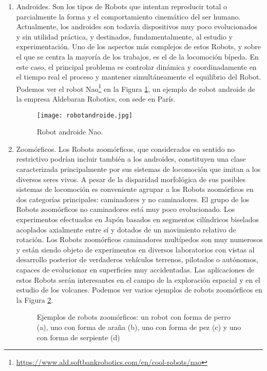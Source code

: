 \begin{enumerate}[1.]
	\item Androides. Son los tipos de Robots que intentan reproducir total o parcialmente la forma y el comportamiento cinemático del ser humano. Actualmente, los androides son todavía dispositivos muy poco evolucionados y sin utilidad práctica, y destinados, fundamentalmente, al estudio y experimentación. Uno de los aspectos más complejos de estos Robots, y sobre el que se centra la mayoría de los trabajos, es el de la locomoción bípeda. En este caso, el principal problema es controlar dinámica y coordinadamente en el tiempo real el proceso y mantener simultáneamente el equilibrio del Robot. Podemos ver el robot Nao\footnote{\url{https://www.ald.softbankrobotics.com/en/cool-robots/nao}} en la Figura \ref{fig:androide}, un ejemplo de robot androide de la empresa Aldebaran Robotics, con sede en París. 
	\begin{figure}[h]
		\centering\texttt{[image: robotandroide.jpg]}
		\caption{Robot androide Nao.}
		\label{fig:androide}
	\end{figure}

	\item Zoomórficos. Los Robots zoomórficos, que considerados en sentido no restrictivo podrían incluir también a los androides, constituyen una clase caracterizada principalmente por sus sistemas de locomoción que imitan a los diversos seres vivos. A pesar de la disparidad morfológica de sus posibles sistemas de locomoción es conveniente agrupar a los Robots zoomórficos en dos categorías principales: caminadores y no caminadores. El grupo de los Robots zoomórficos no caminadores está muy poco evolucionado. Los experimentos efectuados en Japón basados en segmentos cilíndricos biselados acoplados axialmente entre sí y dotados de un movimiento relativo de rotación. Los Robots zoomórficos caminadores multípedos son muy numerosos y están siendo objeto de experimentos en diversos laboratorios con vistas al desarrollo posterior de verdaderos vehículos terrenos, pilotados o autónomos, capaces de evolucionar en superficies muy accidentadas. Las aplicaciones de estos Robots serán interesantes en el campo de la exploración espacial y en el estudio de los volcanes. Podemos ver varios ejemplos de robots zoomórficos en la Figura \ref{fig:zoomorficos}.
	\begin{figure}[h]
		\centering
		\hspace{0.04\textwidth}	
		\vspace{0.03\textwidth}
		\hspace{0.04\textwidth}
		\caption[Diferentes ejemplos de robots zoomórficos]{Ejemplos de robots zoomórficos: un robot con forma de perro (a), uno con forma de araña (b), uno con forma de pez (c) y uno con forma de serpiente (d)} \label{fig:zoomorficos}
	\end{figure}
	

\end{enumerate}
